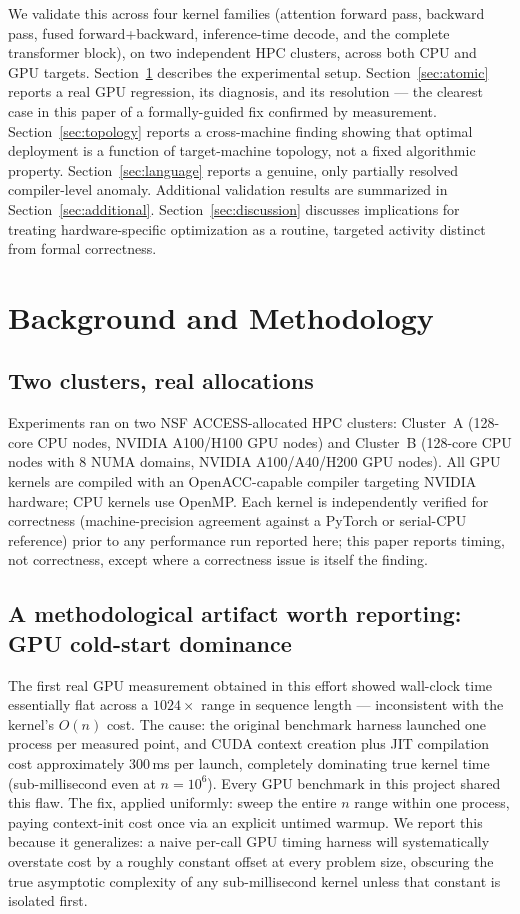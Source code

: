 \documentclass[sigconf,review,anonymous]{acmart}
\begin{document}
We validate this across four kernel families (attention forward pass,
backward pass, fused forward+backward, inference-time decode, and the
complete transformer block), on two independent HPC clusters, across
both CPU and GPU targets. Section~\ref{sec:method} describes the
experimental setup. Section~\ref{sec:atomic} reports a real GPU
regression, its diagnosis, and its resolution --- the clearest case in
this paper of a formally-guided fix confirmed by measurement.
Section~\ref{sec:topology} reports a cross-machine finding showing that
optimal deployment is a function of target-machine topology, not a
fixed algorithmic property. Section~\ref{sec:language} reports a
genuine, only partially resolved compiler-level anomaly. Additional
validation results are summarized in Section~\ref{sec:additional}.
Section~\ref{sec:discussion} discusses implications for treating
hardware-specific optimization as a routine, targeted activity distinct
from formal correctness.

\section{Background and Methodology}
\label{sec:method}

\subsection{Two clusters, real allocations}

Experiments ran on two NSF ACCESS-allocated HPC clusters: Cluster~A
(128-core CPU nodes, NVIDIA A100/H100 GPU nodes) and Cluster~B
(128-core CPU nodes with 8 NUMA domains, NVIDIA A100/A40/H200 GPU
nodes). All GPU kernels are compiled with an OpenACC-capable compiler
targeting NVIDIA hardware; CPU kernels use OpenMP. Each kernel is
independently verified for correctness (machine-precision agreement
against a PyTorch or serial-CPU reference) prior to any performance
run reported here; this paper reports timing, not correctness, except
where a correctness issue is itself the finding.

\subsection{A methodological artifact worth reporting: GPU cold-start dominance}
\label{sec:coldstart}

The first real GPU measurement obtained in this effort showed
wall-clock time essentially flat across a $1024\times$ range in
sequence length --- inconsistent with the kernel's $O(n)$ cost. The
cause: the original benchmark harness launched one process per measured
point, and CUDA context creation plus JIT compilation cost
approximately 300\,ms per launch, completely dominating true kernel
time (sub-millisecond even at $n=10^6$). Every GPU benchmark in this
project shared this flaw. The fix, applied uniformly: sweep the entire
$n$ range within one process, paying context-init cost once via an
explicit untimed warmup. We report this because it generalizes: a
naive per-call GPU timing harness will systematically overstate cost by
a roughly constant offset at every problem size, obscuring the true
asymptotic complexity of any sub-millisecond kernel unless that
constant is isolated first.
\end{document}
